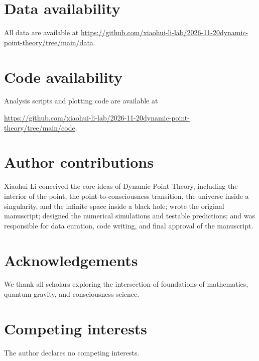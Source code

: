 \documentclass[11pt,a4paper]{article}
\theoremstyle{definition}
\begin{document}
\section*{Data availability}
All data are available at \url{https://github.com/xiaohui-li-lab/2026-11-20dynamic-point-theory/tree/main/data}.

\section*{Code availability}
Analysis scripts and plotting code are available at 

\url{https://github.com/xiaohui-li-lab/2026-11-20dynamic-point-theory/tree/main/code}.

\section*{Author contributions}
Xiaohui Li conceived the core ideas of Dynamic Point Theory, including the interior of the point, the point-to-consciousness transition, the universe inside a singularity, and the infinite space inside a black hole; wrote the original manuscript; designed the numerical simulations and testable predictions; and was responsible for data curation, code writing, and final approval of the manuscript.

\section*{Acknowledgements}
We thank all scholars exploring the intersection of foundations of mathematics, quantum gravity, and consciousness science. 

\section*{Competing interests}
The author declares no competing interests.
\end{document}
